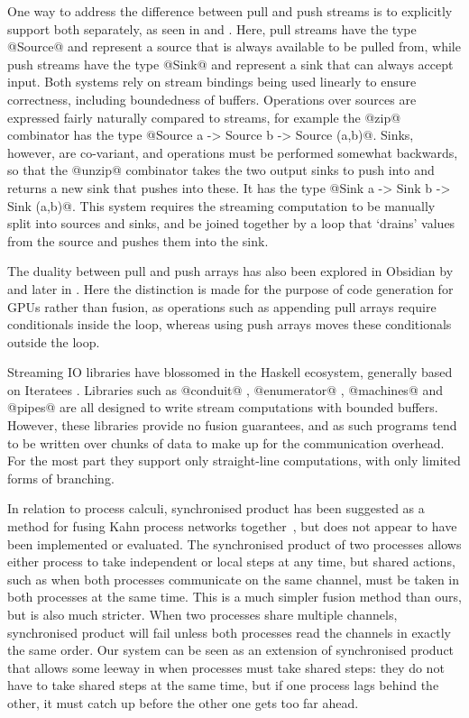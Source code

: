One way to address the difference between pull and push streams is to explicitly support both separately, as seen in \citet{bernardy2015duality} and \citet{lippmeier2016polarized}.
Here, pull streams have the type @Source@ and represent a source that is always available to be pulled from, while push streams have the type @Sink@ and represent a sink that can always accept input.
Both systems rely on stream bindings being used linearly to ensure correctness, including boundedness of buffers.
Operations over sources are expressed fairly naturally compared to streams, for example the @zip@ combinator has the type @Source a -> Source b -> Source (a,b)@.
Sinks, however, are co-variant, and operations must be performed somewhat backwards, so that the @unzip@ combinator takes the two output sinks to push into and returns a new sink that pushes into these.
It has the type @Sink a -> Sink b -> Sink (a,b)@.
This system requires the streaming computation to be manually split into sources and sinks, and be joined together by a loop that `drains' values from the source and pushes them into the sink.

The duality between pull and push arrays has also been explored in Obsidian by \citep{claessen2012expressive} and later in \citep{svensson2014defunctionalizing}.
Here the distinction is made for the purpose of code generation for GPUs rather than fusion, as operations such as appending pull arrays require conditionals inside the loop, whereas using push arrays moves these conditionals outside the loop.

Streaming IO libraries have blossomed in the Haskell ecosystem, generally based on Iteratees \cite{kiselyov2012iteratees}.
Libraries such as @conduit@ \cite{hackage:conduit}, @enumerator@ \cite{hackage:enumerator}, @machines@ \cite{hackage:machines} and @pipes@ \cite{hackage:pipes} are all designed to write stream computations with bounded buffers.
However, these libraries provide no fusion guarantees, and as such programs tend to be written over chunks of data to make up for the communication overhead.
For the most part they support only straight-line computations, with only limited forms of branching.

In relation to process calculi, synchronised product has been suggested as a method for fusing Kahn process networks together~\cite{fradet2004network}, but does not appear to have been implemented or evaluated.
The synchronised product of two processes allows either process to take independent or local steps at any time, but shared actions, such as when both processes communicate on the same channel, must be taken in both processes at the same time.
This is a much simpler fusion method than ours, but is also much stricter.
When two processes share multiple channels, synchronised product will fail unless both processes read the channels in exactly the same order.
Our system can be seen as an extension of synchronised product that allows some leeway in when processes must take shared steps: they do not have to take shared steps at the same time, but if one process lags behind the other, it must catch up before the other one gets too far ahead.

